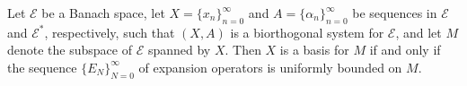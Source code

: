Let $\mathcal{E}$ be a Banach space, let $X = \{x_n\}_{n=0}^{\infty}$ and $A = \{\alpha_n\}_{n=0}^{\infty}$ be sequences in $\mathcal{E}$ and $\mathcal{E}^*$, respectively, such that $(X, A)$ is a biorthogonal system for $\mathcal{E}$, and let $M$ denote the subspace of $\mathcal{E}$ spanned by $X$. Then $X$ is a basis for $M$ if and only if the sequence $\{E_N\}_{N=0}^{\infty}$ of expansion operators is uniformly bounded on $M$.
